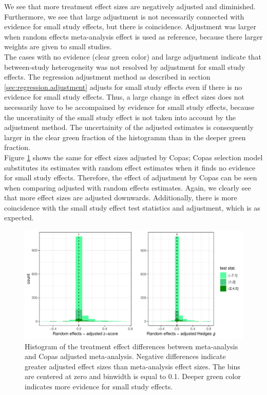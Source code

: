 \documentclass[11pt,a4paper,twoside]{book}\usepackage[]{graphicx}\usepackage[]{color}
\newenvironment{knitrout}{}{} %
\begin{document}
We see that more treatment effect sizes are negatively adjusted and diminished. Furthermore, we see that large adjustment is not necessarily connected with evidence for small study effects, but there is coincidence. Adjustment was larger when random effects meta-analysis effect is used as reference, because there larger weights are given to small studies.\\
The cases with no evidence (clear green color) and large adjustment indicate that between-study heterogeneity was not resolved by adjustment for small study effects. The regression adjustment method as described in section \ref{sec:regression.adjustment} adjusts for small study effects even if there is no evidence for small study effects. Thus, a large change in effect sizes does not necessarily have to be accompained by evidence for small study effects, because the unceratinity of the small study effect is not taken into account by the adjustment method. The uncertainity of the adjusted estimates is consequently larger in the clear green fraction of the histogramm than in the deeper green fraction.\\
Figure \ref{fig:adjustment.copas} shows the same for effect sizes adjusted by Copas; Copas selection model substitutes its estimates with random effect estimates when it finds no evidence for small study effects. Therefore, the effect of adjustment by Copas can be seen when comparing adjusted with random effects estimates. Again, we clearly see that more effect sizes are adjusted downwards. Additionally, there is more coincidence with the small study effect test statistics and adjustment, which is as expected. \\

\begin{figure}
\begin{knitrout}
\color{fgcolor}

{\centering \includegraphics[width=\textwidth-3cm]{figure/ch03_figunnamed-chunk-17-1} 

}



\end{knitrout}
\caption{Histogram of the treatment effect differences between meta-analysis and Copas adjusted meta-analysis. Negative differences indicate greater adjusted effect sizes than meta-analysis effect sizes. The bins are centered at zero and binwidth is equal to 0.1. Deeper green color indicates more evidence for small study effects.}
\label{fig:adjustment.copas}
\end{figure}
\end{document}
